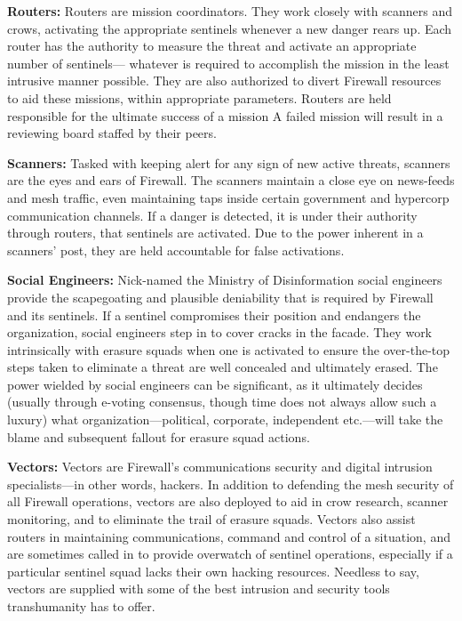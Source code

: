 \textbf{Routers:} Routers are mission coordinators. They work closely with scanners and crows, activating the appropriate sentinels whenever a new danger rears up. Each router has the authority to measure the threat and activate an appropriate number of sentinels— whatever is required to accomplish the mission in the least intrusive manner possible. They are also authorized to divert Firewall resources to aid these missions, within appropriate parameters. Routers are held responsible for the ultimate success of a mission A failed mission will result in a reviewing board staffed by their peers. 

\textbf{Scanners:} Tasked with keeping alert for any sign of new active threats, scanners are the eyes and ears of Firewall. The scanners maintain a close eye on news-feeds and mesh traffic, even maintaining taps inside certain government and hypercorp communication channels. If a danger is detected, it is under their authority through routers, that sentinels are activated. Due to the power inherent in a scanners' post, they are held accountable for false activations. 

\textbf{Social Engineers:} Nick-named the Ministry of Disinformation social engineers provide the scapegoating and plausible deniability that is required by Firewall and its sentinels. If a sentinel compromises their position and endangers the organization, social engineers step in to cover cracks in the facade. They work intrinsically with erasure squads when one is activated to ensure the over-the-top steps taken to eliminate a threat are well concealed and ultimately erased. The power wielded by social engineers can be significant, as it ultimately decides (usually through e-voting consensus, though time does not always allow such a luxury) what organization—political, corporate, independent etc.—will take the blame and subsequent fallout for erasure squad actions. 

\textbf{Vectors:} Vectors are Firewall's communications security and digital intrusion specialists—in other words, hackers. In addition to defending the mesh security of all Firewall operations, vectors are also deployed to aid in crow research, scanner monitoring, and to eliminate the trail of erasure squads. Vectors also assist routers in maintaining communications, command and control of a situation, and are sometimes called in to provide overwatch of sentinel operations, especially if a particular sentinel squad lacks their own hacking resources. Needless to say, vectors are supplied with some of the best intrusion and security tools transhumanity has to offer. 

